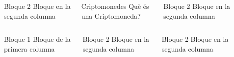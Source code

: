 \documentclass{beamer}
\title[Crypto]{}
\author{Hacking LLiure Squad}
\institute{UB}
\date{Matefest 2018}
\begin{document}
\begin{frame}
  \begin{columns}[t]
  
  \begin{column}{.05\linewidth}
  \end{column}
  
  \begin{column}{.30\linewidth}
  \begin{block}{Bloque 2}
  Bloque en la segunda columna
  \end{block}
  \end{column}
  
  \begin{column}{.30\linewidth}
    \begin{block}{Criptomonedes}
      Què és una Criptomoneda?
    \end{block}
  \end{column}
  
  \begin{column}{.30\linewidth}
  \begin{block}{Bloque 2}
  Bloque en la segunda columna
  \end{block}
  \end{column}
  
  \begin{column}{.05\linewidth}
  \end{column}

  \end{columns}
\end{frame}

\begin{frame}
  \begin{columns}[t]
  
  \begin{column}{.05\linewidth}
  \end{column}

  \begin{column}{.30\linewidth}
  \begin{block}{Bloque 1}
  Bloque de la primera columna
  \end{block}
  \end{column}
  
  \begin{column}{.30\linewidth}
  \begin{block}{Bloque 2}
  Bloque en la segunda columna
  \end{block}
  \end{column}
  
  \begin{column}{.30\linewidth}
  \begin{block}{Bloque 2}
  Bloque en la segunda columna
  \end{block}
  \end{column}
  
  \begin{column}{.05\linewidth}
  \end{column}

  \end{columns}
\end{frame}
\end{document}
